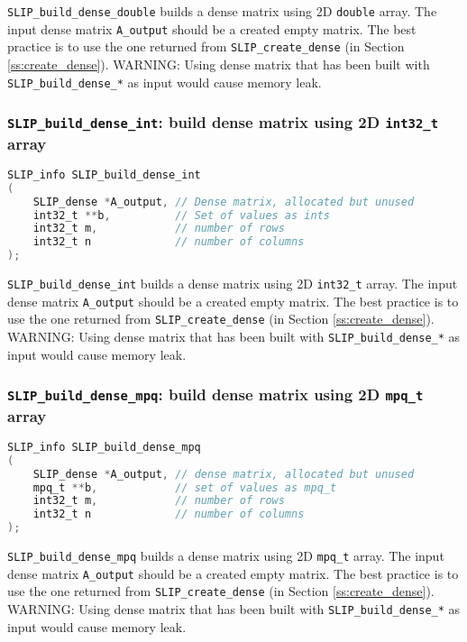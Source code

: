 \documentclass[11pt]{article}
\theoremstyle{definition}
\begin{document}
\verb|SLIP_build_dense_double| builds a dense matrix using 2D \verb|double| array. The input dense matrix \verb|A_output| should be a created empty matrix. The best practice is to use the one returned from \verb|SLIP_create_dense| (in Section \ref{ss:create_dense}). WARNING: Using dense matrix that has been built with \verb|SLIP_build_dense_*| as input would cause memory leak.

\cprotect\subsubsection{\verb|SLIP_build_dense_int|: build dense matrix using 2D \verb|int32_t| array}\label{s:user:build_dense_int}
\begin{lstlisting}[language=C,frame=single]
SLIP_info SLIP_build_dense_int
(
    SLIP_dense *A_output, // Dense matrix, allocated but unused
    int32_t **b,          // Set of values as ints
    int32_t m,            // number of rows
    int32_t n             // number of columns
);
\end{lstlisting}

\verb|SLIP_build_dense_int| builds a dense matrix using 2D \verb|int32_t| array. The input dense matrix \verb|A_output| should be a created empty matrix. The best practice is to use the one returned from \verb|SLIP_create_dense| (in Section \ref{ss:create_dense}). WARNING: Using dense matrix that has been built with \verb|SLIP_build_dense_*| as input would cause memory leak.

\cprotect\subsubsection{\verb|SLIP_build_dense_mpq|: build dense matrix using 2D \verb|mpq_t| array}\label{s:user:build_dense_mpq}
\begin{lstlisting}[language=C,frame=single]
SLIP_info SLIP_build_dense_mpq
(
    SLIP_dense *A_output, // dense matrix, allocated but unused
    mpq_t **b,            // set of values as mpq_t
    int32_t m,            // number of rows
    int32_t n             // number of columns
);
\end{lstlisting}

\verb|SLIP_build_dense_mpq| builds a dense matrix using 2D \verb|mpq_t| array. The input dense matrix \verb|A_output| should be a created empty matrix. The best practice is to use the one returned from \verb|SLIP_create_dense| (in Section \ref{ss:create_dense}). WARNING: Using dense matrix that has been built with \verb|SLIP_build_dense_*| as input would cause memory leak.
\end{document}
